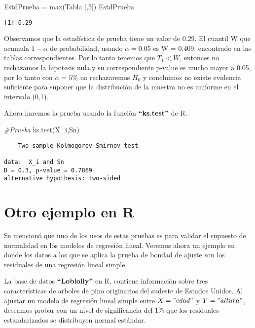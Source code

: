 \documentclass[
  a4paper,
  oneside,
  openany]{book}
\newenvironment{Shaded}{\begin{snugshade}}{\end{snugshade}}
\newcommand{\CommentTok}[1]{\textcolor[rgb]{0.56,0.35,0.01}{\textit{#1}}}
\newcommand{\DecValTok}[1]{\textcolor[rgb]{0.00,0.00,0.81}{#1}}
\newcommand{\FunctionTok}[1]{\textcolor[rgb]{0.00,0.00,0.00}{#1}}
\newcommand{\NormalTok}[1]{#1}
\newcommand{\OtherTok}[1]{\textcolor[rgb]{0.56,0.35,0.01}{#1}}
\begin{document}
\begin{Shaded}
\begin{Highlighting}[]
\NormalTok{EstdPrueba }\OtherTok{=} \FunctionTok{max}\NormalTok{(Tabla [,}\DecValTok{5}\NormalTok{])}
\NormalTok{EstdPrueba}
\end{Highlighting}
\end{Shaded}

\begin{verbatim}
[1] 0.29
\end{verbatim}

Observamos que la estadística de prueba tiene un valor de 0.29. El cuantil W que acumula \(1-\alpha\) de probabilidad, usando \(\alpha=0.05\) es W = 0.409, encontrado en las tablas correspondientes. Por lo tanto tenemos que \(T_1 < W\), entonces no rechazamos la hipotesis nula.y su correspondiente p-value es mucho mayor a 0.05, por lo tanto con \(\alpha=5\%\) no rechazaremos \(H_0\) y concluimos no existe evidencia suficiente para suponer que la distribución de la muestra no es uniforme en el intervalo (0,1).

Ahora haremos la prueba usando la función \textbf{``ks.test''} de R.

\begin{Shaded}
\begin{Highlighting}[]
\CommentTok{\#Prueba}
\FunctionTok{ks.test}\NormalTok{(X\_i,Sn)}
\end{Highlighting}
\end{Shaded}

\begin{verbatim}
    Two-sample Kolmogorov-Smirnov test

data:  X_i and Sn
D = 0.3, p-value = 0.7869
alternative hypothesis: two-sided
\end{verbatim}

\hypertarget{otro-ejemplo-en-r}{%
\section{Otro ejemplo en R}\label{otro-ejemplo-en-r}}

Se mencionó que uno de los usos de estas pruebas es para validar el supuesto de normalidad en los modelos de regresión lineal. Veremos ahora un ejemplo en donde los datos a los que se aplica la prueba de bondad de ajuste son los residuales de una regresión lineal simple.

La base de datos \textbf{``Loblolly''} en R, contiene información sobre tres características de arboles de pino originarios del sudeste de Estados Unidos. Al ajustar un modelo de regresión lineal simple entre \(X="edad"\) y \(Y="altura"\), deseamos probar con un nivel de significancia del \(1\%\) que los residuales estandarizados se distribuyen normal estándar.
\end{document}
